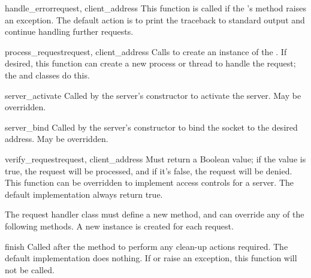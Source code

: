 \begin{funcdesc}{handle_error}{request, client_address}
This function is called if the 's
 method raises an exception.  The default action is
to print the traceback to standard output and continue handling
further requests.
\end{funcdesc}

\begin{funcdesc}{process_request}{request, client_address}
Calls  to create an instance of the
.  If desired, this function can create a
new process or thread to handle the request; the 
and  classes do this.
\end{funcdesc}


\begin{funcdesc}{server_activate}{}
Called by the server's constructor to activate the server.
May be overridden.
\end{funcdesc}

\begin{funcdesc}{server_bind}{}
Called by the server's constructor to bind the socket to the desired
address.  May be overridden.
\end{funcdesc}

\begin{funcdesc}{verify_request}{request, client_address}
Must return a Boolean value; if the value is true, the request will be
processed, and if it's false, the request will be denied.
This function can be overridden to implement access controls for a server.
The default implementation always return true.
\end{funcdesc}

The request handler class must define a new  method,
and can override any of the following methods.  A new instance is
created for each request.

\begin{funcdesc}{finish}{}
Called after the  method to perform any clean-up
actions required.  The default implementation does nothing.  If
 or  raise an exception, this
function will not be called.
\end{funcdesc}

